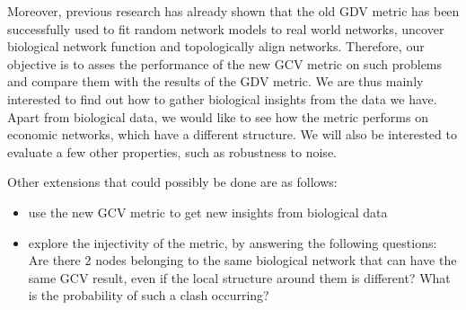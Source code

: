 Moreover, previous research has already shown that the old GDV metric has been
successfully
used to fit random network models to real world
networks\cite{prvzulj2004modeling},  uncover biological network
function\cite{milenkoviae2008uncovering} and topologically align
networks\cite{kuchaiev2010topological}. Therefore, our objective is to asses
the performance of the new GCV metric on such problems and compare them with the
results of the GDV metric. We are thus mainly interested to find out how to
gather biological insights from the data we have. Apart from biological data,
we would like to see how the metric performs on economic networks, which have
a different structure. We will also be interested to evaluate a few other
properties, such as robustness to noise.

Other extensions that could possibly be done are as follows:
\begin{itemize}
\item use the new GCV metric to get new insights from biological data
\item explore the injectivity of the metric, by answering the following
questions: Are there 2 nodes belonging to the same biological network that can
have the same GCV result, even if the local structure around them is different?
What is the probability of such a clash occurring?
\end{itemize}
